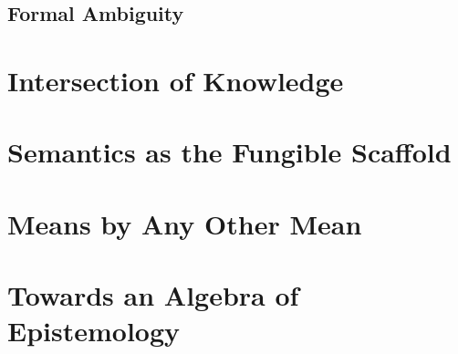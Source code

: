 \documentclass[12pt]{article}
\begin{document}
\subsection{Formal Ambiguity}

\section{Intersection of Knowledge}

\section{Semantics as the Fungible Scaffold}

\section{Means by Any Other Mean}

\section{Towards an Algebra of Epistemology}
\end{document}
